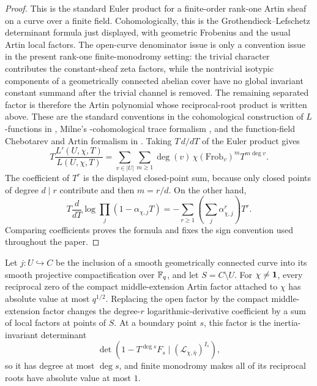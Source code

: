 \begin{proof}
This is the standard Euler product for a finite-order rank-one Artin sheaf on
a curve over a finite field.  Cohomologically, this is the Grothendieck--Lefschetz determinant formula just
displayed, with geometric Frobenius and the usual Artin local factors.  The
open-curve denominator issue is only a convention issue in the present rank-one
finite-monodromy setting: the trivial character contributes the constant-sheaf
zeta factors, while the nontrivial isotypic components of a geometrically
connected abelian cover have no global invariant constant summand after the
trivial channel is removed.  The remaining separated factor is therefore the
Artin polynomial whose reciprocal-root product is written above.  These are the
standard conventions in the cohomological construction of \(L\)-functions in
\cite[Exp. Sommes trigonom\'etriques and Rapport]{DeligneSGA4half1977},
Milne's \etale{}-cohomological trace formalism \cite[Chs.~VI--VII]{Milne1980Etale},
and the function-field Chebotarev and Artin formalism in
\cite{Serre1981,Rosen2002}.  Taking \(T\,d/dT\) of the Euler product gives
\[
T\frac{L'(U,\chi,T)}{L(U,\chi,T)}
=
\sum_{v\in |U|}\sum_{m\ge1}
\deg(v)\,\chi(\mathrm{Frob}_v)^mT^{m\deg v}.
\]
The coefficient of \(T^r\) is the displayed closed-point sum, because only
closed points of degree \(d\mid r\) contribute and then \(m=r/d\).  On the
other hand,
\[
T\frac{d}{dT}\log\prod_j(1-\alpha_{\chi,j}T)
=-\sum_{r\ge1}\left(\sum_j\alpha_{\chi,j}^{r}\right)T^r.
\]
Comparing coefficients proves the formula and fixes the sign convention used
throughout the paper.
\end{proof}

\begin{lemma}\label{lem:artin-weights-boundary-convention}
Let \(j:U\hookrightarrow C\) be the inclusion of a smooth geometrically
connected curve into its smooth projective compactification over \(\mathbb{F}_q\),
and let \(S=C\setminus U\).  For \(\chi\ne\mathbf{1}\), every reciprocal zero of the
compact middle-extension Artin factor attached to \(\chi\) has absolute value
at most \(q^{1/2}\).  Replacing the open factor by the compact
middle-extension factor changes the degree-\(r\) logarithmic-derivative
coefficient by a sum of local factors at points of \(S\).  At a boundary
point \(s\), this factor is the inertia-invariant determinant
\[
\det\!\left(1-T^{\deg s}F_s\mid(\mathcal L_{\chi,\bar\eta})^{I_s}\right),
\]
so it has degree at most \(\deg s\), and finite monodromy makes all of its
reciprocal roots have absolute value at most \(1\).
\end{lemma}

